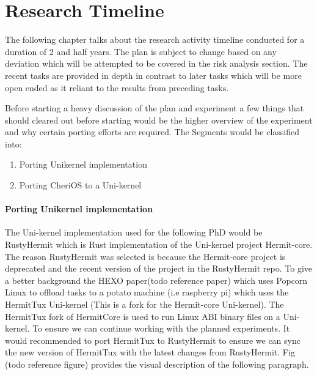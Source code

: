 
\chapter{Research Timeline}  %
The following chapter talks about the research activity timeline conducted for a duration of 2 and half years. 
The plan is subject to change based on any deviation which will be attempted to be covered in the risk analysis 
section. The recent tasks are provided in depth in contrast to later tasks which will be more open ended 
as it reliant to the results from preceding tasks. 

Before starting a heavy discussion of the plan and experiment a few things that should cleared out before starting would be 
the higher overview of the experiment and why certain porting efforts are required. The Segments would be classified into: 
\begin{enumerate}
  \item Porting Unikernel implementation 
  \item Porting CheriOS to a Uni-kernel
\end{enumerate}

\subsubsection{Porting Unikernel implementation}
The Uni-kernel implementation used for the following PhD would be RustyHermit 
which is Rust implementation of the Uni-kernel project Hermit-core. The reason 
RustyHermit was selected is because the Hermit-core project is deprecated and 
the recent version of the project in the RustyHermit repo. To give a better 
background the HEXO paper(todo reference paper) which uses Popcorn Linux to offload 
tasks to a potato machine (i.e raspberry pi) which uses the HermitTux Uni-kernel (This 
is a fork for the Hermit-core Uni-kernel). The HermitTux fork of HermitCore is used to 
run Linux ABI binary files on a Uni-kernel. To ensure we can continue working with the
planned experiments. It would recommended to port HermitTux to RustyHermit to ensure we 
can sync the new version of HermitTux with the latest changes from RustyHermit. Fig (todo
reference figure) provides the visual description of the following paragraph. 

